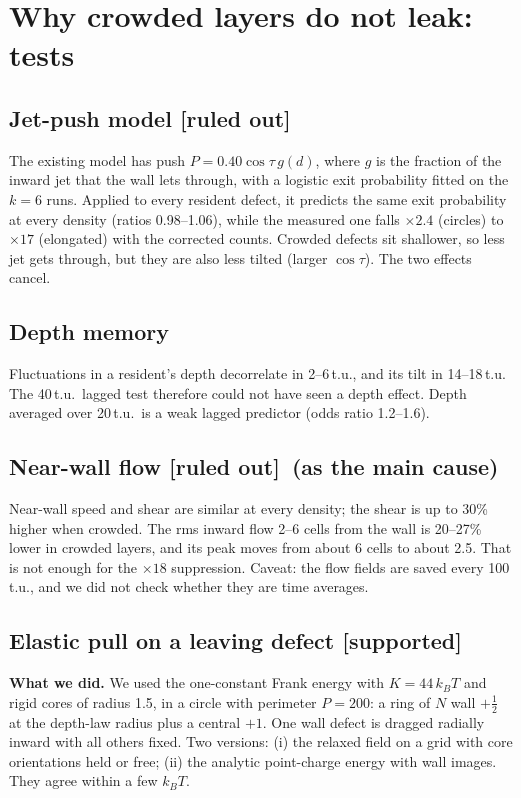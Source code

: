 \documentclass[11pt,a4paper]{article}
\newcommand{\half}{\tfrac12}
\newcommand{\kT}{k_BT}
\newcommand{\supp}{\textbf{\textcolor{green!50!black}{[supported]}}}
\newcommand{\out}{\textbf{\textcolor{red!70!black}{[ruled out]}}}
\begin{document}
\section{Why crowded layers do not leak: tests}
\subsection{Jet-push model \out}
The existing model has push $P=0.40\cos\tau\,g(d)$, where $g$ is the fraction of the inward jet that the wall lets through, with a logistic exit
probability fitted on the $k=6$ runs. Applied to every resident defect, it predicts the same exit probability at every density (ratios 0.98--1.06),
while the measured one falls $\times2.4$ (circles) to $\times17$ (elongated) with the corrected counts. Crowded defects sit shallower, so less jet gets through, but they are also less tilted (larger
$\cos\tau$). The two effects cancel.

\subsection{Depth memory}
Fluctuations in a resident's depth decorrelate in 2--6\,t.u., and its tilt in 14--18\,t.u. The 40\,t.u.\ lagged test therefore could not have
seen a depth effect. Depth averaged over 20\,t.u.\ is a weak lagged predictor (odds ratio 1.2--1.6).

\subsection{Near-wall flow \out\ (as the main cause)}
Near-wall speed and shear are similar at every density; the shear is up to 30\% higher when crowded. The rms inward flow 2--6 cells from the wall is
20--27\% lower in crowded layers, and its peak moves from about 6 cells to about 2.5. That is not enough for the $\times18$ suppression. Caveat: the flow
fields are saved every 100\,t.u., and we did not check whether they are time averages.

\subsection{Elastic pull on a leaving defect \supp}
\textbf{What we did.} We used the one-constant Frank energy with $K=44\,\kT$ and rigid cores of radius 1.5, in a circle with perimeter $P=200$: a
ring of $N$ wall $+\half$ at the depth-law radius plus a central $+1$. One wall defect is dragged radially inward with all others fixed. Two
versions: (i) the relaxed field on a grid with core orientations held or free; (ii) the analytic point-charge energy with wall images. They agree
within a few $\kT$.
\end{document}
